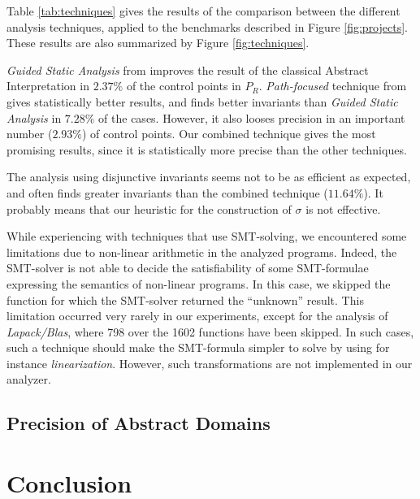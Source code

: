 \documentclass[preprint]{sigplanconf}
\begin{document}
Table \ref{tab:techniques} gives the results of the comparison between the
different analysis techniques, applied to the benchmarks described in Figure
\ref{fig:projects}. These results are also summarized by Figure \ref{fig:techniques}.

\emph{Guided Static Analysis} from \citet{DBLP:conf/sas/GopanR07} improves the
result of the classical Abstract Interpretation in $2.37\%$ of the control points
in $P_R$.
\emph{Path-focused} technique from \citet{Monniaux_Gonnord_SAS11} gives
statistically better results, and finds better invariants than \emph{Guided
Static Analysis} in $7.28\%$ of the cases. However, it also looses precision in an
important number ($2.93\%$) of control points.
Our combined technique gives the most promising results, since it is
statistically more precise than the other techniques.

The analysis using disjunctive invariants seems not to be as efficient as
expected, and often finds greater invariants than the combined technique
($11.64\%$). It probably means that our heuristic for the construction of
$\sigma$ is not effective.

While experiencing with techniques that use SMT-solving, we encountered some
limitations due to non-linear arithmetic in the analyzed programs. Indeed, 
the SMT-solver is not able to decide the satisfiability of some SMT-formulae
expressing the semantics of non-linear programs. 
In this case, we skipped the function for which the SMT-solver returned the
``unknown'' result.
This limitation occurred very rarely in our experiments, except for the analysis
of \emph{Lapack/Blas}, where 798 over the 1602 functions have been skipped.
In such cases, such a technique should make the SMT-formula simpler to solve by using
for instance \emph{linearization}. However, such transformations are not
implemented in our analyzer.

\subsection{Precision of Abstract Domains}


\section{Conclusion}









\end{document}
